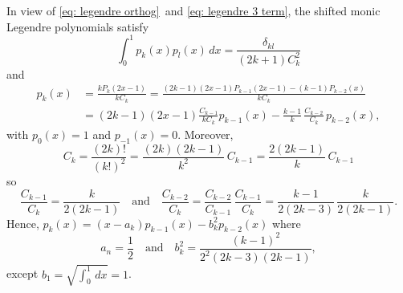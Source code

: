 \documentclass[12pt,a4paper]{article}
\begin{document}
In view of \eqref{eq: legendre orthog}~and 
\eqref{eq: legendre 3 term}, the shifted monic Legendre polynomials 
satisfy
\[
\int_0^1p_k(x)p_l(x)\,dx=\frac{\delta_{kl}}{(2k+1)C_k^2}
\]
and
\begin{align*}
p_k(x)&=\frac{kP_k(2x-1)}{kC_k}
	=\frac{(2k-1)(2x-1)P_{k-1}(2x-1)-(k-1)P_{k-2}(x)}{kC_k}\\
	&=(2k-1)(2x-1)\frac{C_{k-1}}{kC_k}p_{k-1}(x)
		-\frac{k-1}{k}\,\frac{C_{k-2}}{C_k}\,p_{k-2}(x),
\end{align*}
with $p_0(x)=1$ and $p_{-1}(x)=0$.  Moreover,
\[
C_k=\frac{(2k)!}{(k!)^2}=\frac{(2k)(2k-1)}{k^2}\,C_{k-1}
	=\frac{2(2k-1)}{k}\,C_{k-1}
\]
so
\[
\frac{C_{k-1}}{C_k}=\frac{k}{2(2k-1)}
\quad\text{and}\quad
\frac{C_{k-2}}{C_k}=\frac{C_{k-2}}{C_{k-1}}\,\frac{C_{k-1}}{C_k}
	=\frac{k-1}{2(2k-3)}\,\frac{k}{2(2k-1)}.
\]
Hence, $p_k(x)=(x-a_k)p_{k-1}(x)-b_k^2p_{k-2}(x)$ where
\[
a_n=\frac{1}{2}\quad\text{and}\quad
b_k^2=\frac{(k-1)^2}{2^2(2k-3)(2k-1)},
\]
except $b_1=\sqrt{\int_0^1\,dx}=1$.










\end{document}
